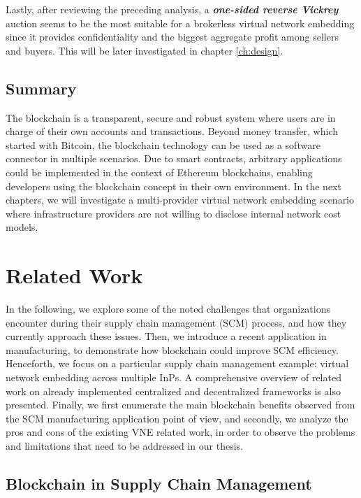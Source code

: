 Lastly, after reviewing the preceding analysis, a \textbf{\textit{one-sided reverse Vickrey}} auction seems to be the most suitable for a brokerless virtual network embedding since it provides confidentiality and the biggest aggregate profit among sellers and buyers. This will be later investigated in chapter \ref{ch:design}.

\section{Summary}

The blockchain is a transparent, secure and robust system where users are in charge of their own accounts and transactions. Beyond money transfer, which started with Bitcoin, the blockchain technology can be used as a software connector in multiple scenarios. Due to smart contracts, arbitrary applications could be implemented in the context of Ethereum blockchains, enabling developers using the blockchain concept in their own environment. In the next chapters, we will investigate a multi-provider virtual network embedding scenario where infrastructure providers are not willing to disclose internal network cost models.

\chapter{Related Work}
\label{ch:relatedwork}

In the following, we explore some of the noted challenges that organizations encounter during their supply chain management (SCM) process, and how they currently approach these issues. Then, we introduce a recent application in manufacturing, to demonstrate how blockchain could improve SCM efficiency. Henceforth, we focus on a particular supply chain management example: virtual network embedding across multiple InPs. A comprehensive overview of related work on already implemented centralized and decentralized frameworks is also presented. Finally, we first enumerate the main blockchain benefits observed from the SCM manufacturing application point of view, and secondly, we analyze the pros and cons of the existing VNE related work, in order to observe the problems and limitations that need to be addressed in our thesis.

\section{Blockchain in Supply Chain Management}


